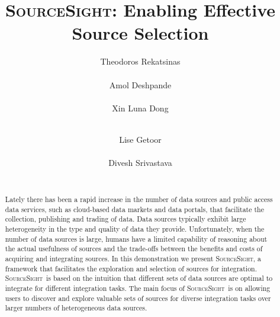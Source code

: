 \documentclass{vldb}
\newcommand\system{\textsc{SourceSight}}
\begin{document}

\title{{\LARGE \system}: Enabling Effective Source Selection}


\author{
\alignauthor
Theodoros Rekatsinas\\
       \\
\alignauthor
Amol Deshpande\\
       \\
\alignauthor 
Xin Luna Dong\\
       \\
\and  %
\alignauthor 
Lise Getoor\\
       \\
\alignauthor Divesh Srivastava\\
       \\
}

\maketitle

\begin{abstract}
Lately there has been a rapid increase in the number of data sources and public access data services, such as cloud-based data markets and data portals, that facilitate the collection, publishing and trading of data. Data sources typically exhibit large heterogeneity in the type and quality of data they provide. Unfortunately, when the number of data sources is large, humans have a limited capability of reasoning about the actual usefulness of sources and the trade-offs between the benefits and costs of acquiring and integrating sources. In this demonstration we present \system, a framework that facilitates the exploration and selection of sources for integration. \system~is based on the intuition that different sets of data sources are optimal to integrate for different integration tasks. The main focus of \system~is on allowing users to discover and explore valuable sets of sources for diverse integration tasks over larger numbers of heterogeneous data sources.
\end{abstract}
\end{document}
